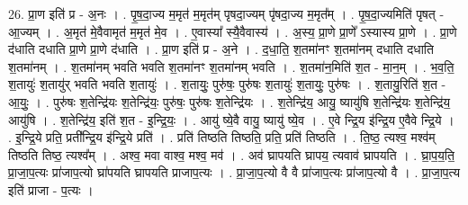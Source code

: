 \documentclass[17pt]{extarticle}
\begin{document}
26. प्रा॒ण इति॑ प्र - अ॒नः । . पृ॒ष॒दा॒ज्य म॒मृत॑ म॒मृत॑म् पृषदा॒ज्यम् पृ॑षदा॒ज्य म॒मृत᳚म् । . पृ॒ष॒दा॒ज्यमिति॑ पृषत् - आ॒ज्यम् । . अ॒मृत॑ मे॒वैवामृत॑ म॒मृत॑ मे॒व । . ए॒वास्या᳚ स्यै॒वैवास्य॑ । . अ॒स्य॒ प्रा॒णे प्रा॒णे᳚ ऽस्यास्य प्रा॒णे । . प्रा॒णे द॑धाति दधाति प्रा॒णे प्रा॒णे द॑धाति । . प्रा॒ण इति॑ प्र - अ॒ने । . द॒धा॒ति॒ श॒तमा॑नꣳ श॒तमा॑नम् दधाति दधाति श॒तमा॑नम् । . श॒तमा॑नम् भवति भवति श॒तमा॑नꣳ श॒तमा॑नम् भवति । . श॒तमा॑न॒मिति॑ श॒त - मा॒न॒म् । . भ॒व॒ति॒ श॒तायुः॑ श॒तायु॑र् भवति भवति श॒तायुः॑ । . श॒तायुः॒ पुरु॑षः॒ पुरु॑षः श॒तायुः॑ श॒तायुः॒ पुरु॑षः । . श॒तायु॒रिति॑ श॒त - आ॒युः॒ । . पुरु॑षः श॒तेन्द्रि॑यः श॒तेन्द्रि॑यः॒ पुरु॑षः॒ पुरु॑षः श॒तेन्द्रि॑यः । . श॒तेन्द्रि॑य॒ आयु॒ ष्यायु॑षि श॒तेन्द्रि॑यः श॒तेन्द्रि॑य॒ आयु॑षि । . श॒तेन्द्रि॑य॒ इति॑ श॒त - इ॒न्द्रि॒यः॒ । . आयु॑ ष्ये॒वै वायु॒ ष्यायु॑ ष्ये॒व । . ए॒वे न्द्रि॒य इ॑न्द्रि॒य ए॒वैवे न्द्रि॒ये । . इ॒न्द्रि॒ये प्रति॒ प्रती᳚न्द्रि॒य इ॑न्द्रि॒ये प्रति॑ । . प्रति॑ तिष्ठति तिष्ठति॒ प्रति॒ प्रति॑ तिष्ठति । . ति॒ष्ठ॒ त्यश्व॒ मश्व॑म् तिष्ठति तिष्ठ॒ त्यश्व᳚म् । . अश्व॒ मवा वाश्व॒ मश्व॒ मव॑ । . अव॑ घ्रापयति घ्रापय॒ त्यवाव॑ घ्रापयति । . घ्रा॒प॒य॒ति॒ प्रा॒जा॒प॒त्यः प्रा॑जाप॒त्यो घ्रा॑पयति घ्रापयति प्राजाप॒त्यः । . प्रा॒जा॒प॒त्यो वै वै प्रा॑जाप॒त्यः प्रा॑जाप॒त्यो वै । . प्रा॒जा॒प॒त्य इति॑ प्राजा - प॒त्यः । \newline
\end{document}
